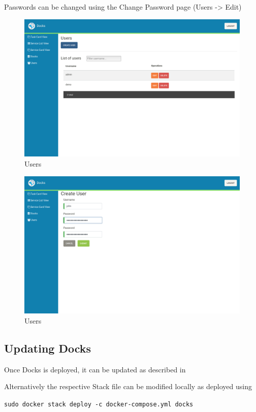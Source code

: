 \documentclass[]{article}
\let\oldtexttt\texttt
\renewcommand{\texttt}[1]{
	\colorbox{Light}{\oldtexttt{#1}}
}
\begin{document}
Passwords can be changed using the Change Password page (Users -> Edit)

\begin{figure}[H]
	\centering
	\includegraphics[scale=0.4]{users.png}
	\caption{Users}
\end{figure}

\begin{figure}[H]
	\centering
	\includegraphics[scale=0.4]{users_create.png}
	\caption{Users}
\end{figure}


\subsection{Updating Docks}
Once Docks is deployed, it can be updated as described in 

Alternatively the respective Stack file can be modified locally as deployed using
\texttt{sudo docker stack deploy -c docker-compose.yml docks}
\end{document}
